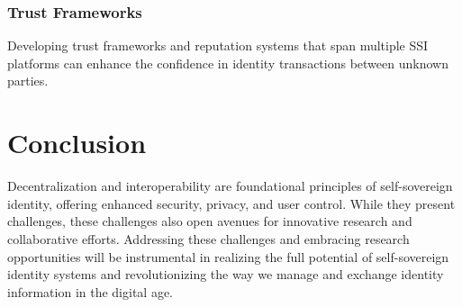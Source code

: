 \subsubsection*{Trust Frameworks} Developing trust frameworks and reputation systems that span multiple SSI platforms can enhance the confidence in identity transactions between unknown parties.

\section*{Conclusion}
Decentralization and interoperability are foundational principles of self-sovereign identity, offering enhanced security, privacy, and user control. While they present challenges, these challenges also open avenues for innovative research and collaborative efforts. Addressing these challenges and embracing research opportunities will be instrumental in realizing the full potential of self-sovereign identity systems and revolutionizing the way we manage and exchange identity information in the digital age.
